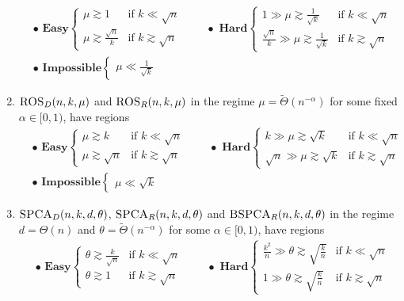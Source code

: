 \documentclass[11pt]{article}
\begin{document}
\begin{theorem}
\begin{enumerate}
\begin{align*}
&\bullet \, \, \mathbf{Easy} \left\{ \begin{array}{ll} \mu \gtrsim 1 &\text{if } k \ll \sqrt{n} \\ \mu \gtrsim \frac{\sqrt{n}}{k} &\text{if } k \gtrsim \sqrt{n} \end{array} \right. \quad \quad  \bullet \, \, \mathbf{Hard} \left\{ \begin{array}{ll} 1 \gg \mu \gtrsim \frac{1}{\sqrt{k}} &\text{if } k \ll \sqrt{n} \\ \frac{\sqrt{n}}{k} \gg \mu \gtrsim \frac{1}{\sqrt{k}} &\text{if } k \gtrsim \sqrt{n} \end{array} \right. \\
& \bullet \, \, \mathbf{Impossible} \left\{ \begin{array}{ll} \mu \ll \frac{1}{\sqrt{k}} \end{array} \right.
\end{align*}
\item $\textsc{ROS}_D(n, k, \mu)$ and $\textsc{ROS}_R(n, k, \mu)$ in the regime $\mu = \tilde{\Theta}(n^{-\alpha})$ for some fixed $\alpha \in [0, 1)$, have regions
\begin{align*}
&\bullet \, \, \mathbf{Easy} \left\{ \begin{array}{ll} \mu \gtrsim k &\text{if } k \ll \sqrt{n} \\ \mu \gtrsim \sqrt{n} &\text{if } k \gtrsim \sqrt{n} \end{array} \right. \quad \quad  \bullet \, \, \mathbf{Hard} \left\{ \begin{array}{ll} k \gg \mu \gtrsim \sqrt{k} &\text{if } k \ll \sqrt{n} \\ \sqrt{n} \gg \mu \gtrsim \sqrt{k} &\text{if } k \gtrsim \sqrt{n} \end{array} \right. \\
& \bullet \, \, \mathbf{Impossible} \left\{ \begin{array}{ll} \mu \ll \sqrt{k} \end{array} \right.
\end{align*}
\item $\textsc{SPCA}_D(n, k, d, \theta)$, $\textsc{SPCA}_R(n, k, d, \theta)$ and $\textsc{BSPCA}_R(n, k, d, \theta)$ in the regime $d = \Theta(n)$ and $\theta = \tilde{\Theta}(n^{-\alpha})$ for some $\alpha \in [0, 1)$, have regions
\begin{align*}
&\bullet \, \, \mathbf{Easy} \left\{ \begin{array}{ll} \theta \gtrsim \frac{k}{\sqrt{n}} &\text{if } k \ll \sqrt{n} \\ \theta \gtrsim 1 &\text{if } k \gtrsim \sqrt{n} \end{array} \right. \quad \quad  \bullet \, \, \mathbf{Hard} \left\{ \begin{array}{ll} \frac{k^2}{n} \gg \theta \gtrsim \sqrt{\frac{k}{n}} &\text{if } k \ll \sqrt{n} \\ 1 \gg \theta \gtrsim \sqrt{\frac{k}{n}} &\text{if } k \gtrsim \sqrt{n} \end{array} \right. \\

\end{align*}
\end{enumerate}
\end{theorem}
\end{document}
